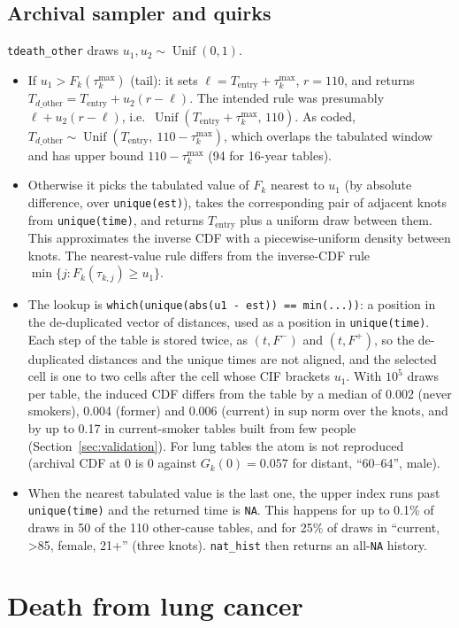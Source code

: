 \documentclass[11pt]{article}
\newcommand{\code}[1]{\texttt{#1}}
\newcommand{\Unif}{\operatorname{Unif}}
\newcommand{\Tentry}{T_{\mathrm{entry}}}
\newcommand{\Tdo}{T_{d\_\mathrm{other}}}
\begin{document}
\subsection{Archival sampler and quirks}
\code{tdeath\_other} draws $u_1,u_2\sim\Unif(0,1)$.
\begin{itemize}[nosep]
\item If $u_1 > F_k(\tau^{\max}_k)$ (tail): it sets $\ell = \Tentry + \tau^{\max}_k$,
  $r=110$, and returns $\Tdo = \Tentry + u_2(r-\ell)$. The intended rule was
  presumably $\ell + u_2(r-\ell)$, i.e.\ $\Unif(\Tentry+\tau^{\max}_k,\,110)$. As
  coded, $\Tdo\sim\Unif(\Tentry,\ 110-\tau^{\max}_k)$, which overlaps the
  tabulated window and has upper bound $110-\tau^{\max}_k$ (94 for 16-year
  tables).
\item Otherwise it picks the tabulated value of $F_k$ nearest to $u_1$ (by
  absolute difference, over \code{unique(est)}), takes the corresponding pair
  of adjacent knots from \code{unique(time)}, and returns $\Tentry$ plus a uniform
  draw between them. This approximates the inverse CDF with a
  piecewise-uniform density between knots. The nearest-value rule differs from
  the inverse-CDF rule $\min\{j: F_k(\tau_{k,j}) \ge u_1\}$.
\item The lookup is \code{which(unique(abs(u1 - est)) == min(...))}: a position
  in the de-duplicated vector of distances, used as a position in
  \code{unique(time)}. Each step of the table is stored twice, as
  $(t, F^-)$ and $(t, F^+)$, so the de-duplicated distances and the unique times
  are not aligned, and the selected cell is one to two cells after the cell
  whose CIF brackets $u_1$. With $10^5$ draws per table, the induced CDF differs
  from the table by a median of 0.002 (never smokers), 0.004 (former) and 0.006
  (current) in sup norm over the knots, and by up to 0.17 in current-smoker
  tables built from few people (Section~\ref{sec:validation}). For lung tables
  the atom is not reproduced (archival CDF at 0 is 0 against $G_k(0)=0.057$ for
  distant, ``60--64'', male).
\item When the nearest tabulated value is the last one, the upper index runs past
  \code{unique(time)} and the returned time is \code{NA}. This happens for up to
  0.1\% of draws in 50 of the 110 other-cause tables, and for 25\% of draws in
  ``current, >85, female, 21+'' (three knots). \code{nat\_hist} then returns
  an all-\code{NA} history.
\end{itemize}

\section{Death from lung cancer}\label{sec:lc}
\end{document}
